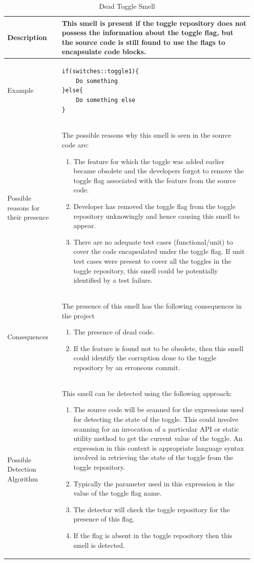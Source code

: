 \documentclass[conference]{IEEEtran}
\begin{document}
\begin{table}[ht]
\caption{Dead Toggle Smell}
\centering
\begin{tabular}{|p{1.5cm}|p{7cm}|}
 \hline\hline
 Description & This smell is present if the toggle repository does not possess the information about the toggle flag, but the source code is still found to use the flags to encapsulate code blocks. \\ \hline
 Example & 
 \begin{lstlisting}
if(switches::toggle1){
    Do something
}else{
    Do something else
}
 \end{lstlisting}
  \\ \hline

 Possible reasons for their presence & The possible reasons why this smell is seen in the source code are:
 \begin{enumerate}
 \item{The feature for which the toggle was added earlier became obsolete and the developers forgot to remove the toggle flag associated with the feature from the source code.}
 \item{Developer has removed the toggle flag from the toggle repository unknowingly and hence causing this smell to appear.}
 \item{There are no adequate test cases (functional/unit) to cover the code encapsulated under the toggle flag. If unit test cases were present to cover all the toggles in the toggle repository, this smell could be potentially identified by a test failure.}
 \end{enumerate}
 \\ \hline
 
 Consequences & The presence of this smell has the following consequences in the project
 \begin{enumerate}
 \item{The presence of dead code.}
 \item{If the feature is found not to be obsolete, then this smell could identify the corruption done to the toggle repository by an erroneous commit.}
 \end{enumerate}
 \\ \hline
 
Possible Detection Algorithm & This smell can be detected using the following approach:
 \begin{enumerate}
 \item{The source code will be scanned for the expressions used for detecting the state of the toggle. This could involve scanning for an invocation of a particular API or static utility method to get the current value of the toggle. An expression in this context is appropriate language syntax involved in retrieving the state of the toggle from the toggle repository.}
 \item{Typically the parameter used in this expression is the value of the toggle flag name.}
 \item{The detector will check the toggle repository for the presence of this flag.}
 \item{If the flag is absent in the toggle repository then this smell is detected.}
 \end{enumerate}
 

\end{tabular}
\end{table}
\end{document}
